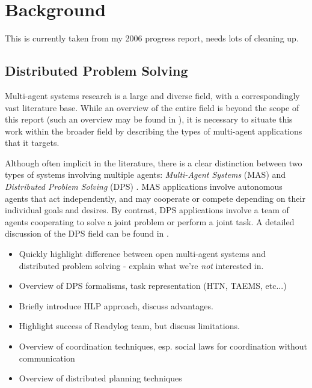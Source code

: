  


\chapter{Background}

\label{ch:background} 

This is currently taken from my 2006 progress report, needs lots of
cleaning up.


\section{Distributed Problem Solving}

Multi-agent systems research is a large and diverse field, with a
correspondingly vast literature base. While an overview of the entire
field is beyond the scope of this report (such an overview may be
found in \cite{nwana95software_agents,mataric95issues_designing_agents}),
it is necessary to situate this work within the broader field by describing
the types of multi-agent applications that it targets.

Although often implicit in the literature, there is a clear distinction
between two types of systems involving multiple agents: \emph{Multi-Agent
Systems} (MAS) and \emph{Distributed Problem Solving} (DPS) \cite{nwana95software_agents,mataric95issues_designing_agents}.
MAS applications involve autonomous agents that act independently,
and may cooperate or compete depending on their individual goals and
desires. By contrast, DPS applications involve a team of agents cooperating
to solve a joint problem or perform a joint task. A detailed discussion
of the DPS field can be found in \cite{Durfee91dps}.

\begin{itemize}
\item Quickly highlight difference between open multi-agent systems and
distributed problem solving - explain what we're \emph{not} interested
in. 
\item Overview of DPS formalisms, task representation (HTN, TAEMS, etc...) 
\item Briefly introduce HLP approach, discuss advantages. 
\item Highlight success of Readylog team, but discuss limitations. 
\item Overview of coordination techniques, esp. social laws for coordination
without communication 
\item Overview of distributed planning techniques \cite{desjardins99survey_dist_planning} 
\end{itemize}

